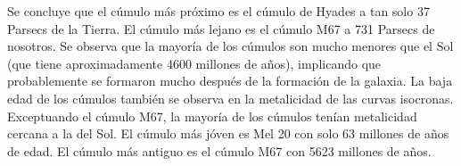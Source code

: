 \documentclass[12pt]{article}
\begin{document}
Se concluye que el cúmulo más próximo es el cúmulo de Hyades a tan solo 37 Parsecs de la Tierra. El cúmulo más lejano es el cúmulo M67 a 731 Parsecs de nosotros. Se observa que la mayoría de los cúmulos son mucho menores que el Sol (que tiene aproximadamente 4600 millones de años), implicando que probablemente se formaron mucho después de la formación de la galaxia. La baja edad de los cúmulos también se observa en la metalicidad de las curvas isocronas. Exceptuando el cúmulo M67, la mayoría de los cúmulos tenían metalicidad cercana a la del Sol. El cúmulo más jóven es Mel 20 con solo 63 millones de años de edad. El cúmulo más antiguo es el cúmulo M67 con 5623 millones de años.





















\end{document}
